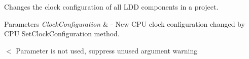 Changes the clock configuration of all L\+DD components in a project. 


\begin{DoxyParams}{Parameters}
{\em Clock\+Configuration} & -\/ New C\+PU clock configuration changed by C\+PU Set\+Clock\+Configuration method. \\
\hline
\end{DoxyParams}
$<$ Parameter is not used, suppress unused argument warning 